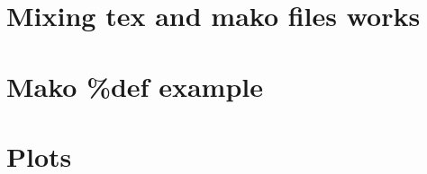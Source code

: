 \documentclass[letter, article]{article}
\begin{document}
\section{Mixing tex and mako files works}



\section{Mako \%def example}



\section{Plots}


\end{document}

